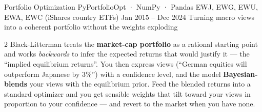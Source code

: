 \documentclass{pyportfolios-note}
\begin{document}
\thispagestyle{notecover}





\notecard
  {Portfolio Optimization}
  {PyPortfolioOpt · NumPy · Pandas}
  {EWJ, EWG, EWU, EWA, EWC (iShares country ETFs)}
  {Jan 2015 – Dec 2024}
  {Turning macro views into a coherent portfolio without the weights exploding}

\noteneedroom{150bp}

\begin{multicols}{2}
Black-Litterman treats the \textbf{market-cap portfolio} as a rational starting
point and works \textit{backwards} to infer the expected returns that would
justify it — the ``implied equilibrium returns''. You then express views
(``German equities will outperform Japanese by 3\%'') with a confidence level,
and the model \textbf{Bayesian-blends} your views with the equilibrium prior.
Feed the blended returns into a standard optimizer and you get sensible weights
that tilt toward your views in proportion to your confidence — and revert to the
market when you have none.
\end{multicols}

\noteneedroom{170bp}
\end{document}
